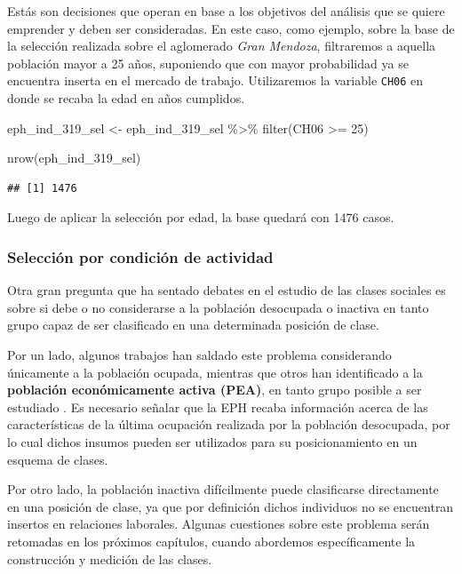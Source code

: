 \documentclass[
]{book}
\newenvironment{Shaded}{\begin{snugshade}}{\end{snugshade}}
\newcommand{\DecValTok}[1]{\textcolor[rgb]{0.00,0.00,0.81}{#1}}
\newcommand{\FunctionTok}[1]{\textcolor[rgb]{0.00,0.00,0.00}{#1}}
\newcommand{\NormalTok}[1]{#1}
\newcommand{\OtherTok}[1]{\textcolor[rgb]{0.56,0.35,0.01}{#1}}
\newcommand{\SpecialCharTok}[1]{\textcolor[rgb]{0.00,0.00,0.00}{#1}}
\begin{document}
Estás son decisiones que operan en base a los objetivos del análisis que se quiere emprender y deben ser consideradas. En este caso, como ejemplo, sobre la base de la selección realizada sobre el aglomerado \emph{Gran Mendoza}, filtraremos a aquella población mayor a 25 años, suponiendo que con mayor probabilidad ya se encuentra inserta en el mercado de trabajo. Utilizaremos la variable \texttt{CH06} en donde se recaba la edad en años cumplidos.

\begin{Shaded}
\begin{Highlighting}[]
\NormalTok{eph\_ind\_319\_sel }\OtherTok{\textless{}{-}}\NormalTok{ eph\_ind\_319\_sel }\SpecialCharTok{\%\textgreater{}\%} 
    \FunctionTok{filter}\NormalTok{(CH06 }\SpecialCharTok{\textgreater{}=} \DecValTok{25}\NormalTok{)}

\FunctionTok{nrow}\NormalTok{(eph\_ind\_319\_sel)}
\end{Highlighting}
\end{Shaded}

\begin{verbatim}
## [1] 1476
\end{verbatim}

Luego de aplicar la selección por edad, la base quedará con 1476 casos.

\hypertarget{selecciuxf3n-por-condiciuxf3n-de-actividad}{%
\subsubsection{Selección por condición de actividad}\label{selecciuxf3n-por-condiciuxf3n-de-actividad}}

Otra gran pregunta que ha sentado debates en el estudio de las clases sociales es sobre si debe o no considerarse a la población desocupada o inactiva en tanto grupo capaz de ser clasificado en una determinada posición de clase.

Por un lado, algunos trabajos han saldado este problema considerando únicamente a la población ocupada, mientras que otros han identificado a la \textbf{población económicamente activa (PEA)}, en tanto grupo posible a ser estudiado \citep{Torrado1998}. Es necesario señalar que la EPH recaba información acerca de las características de la última ocupación realizada por la población desocupada, por lo cual dichos insumos pueden ser utilizados para su posicionamiento en un esquema de clases.

Por otro lado, la población inactiva difícilmente puede clasificarse directamente en una posición de clase, ya que por definición dichos individuos no se encuentran insertos en relaciones laborales. Algunas cuestiones sobre este problema serán retomadas en los próximos capítulos, cuando abordemos específicamente la construcción y medición de las clases.
\end{document}

